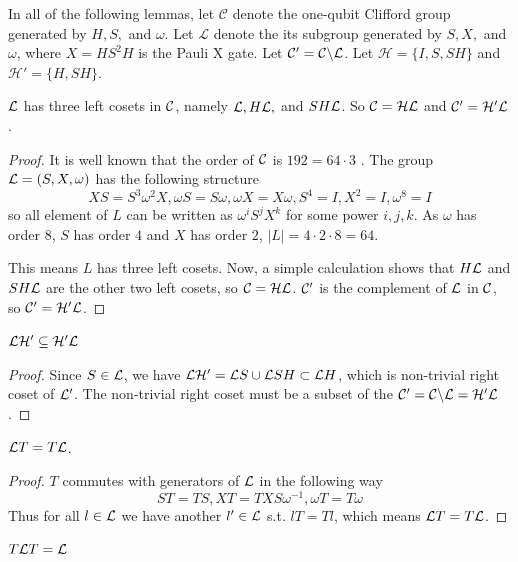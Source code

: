 In all of the following lemmas, let $\mathcal{C}$ denote the one-qubit Clifford group generated by $H, S,$ and $\omega$. 
Let $\mathcal{L}$ denote the its subgroup generated by $S, X, $ and $\omega$, where $X = HS^2H$ is the Pauli X gate. 
Let $\mathcal{C} ' =  \mathcal{C} \backslash \mathcal{L}$.
Let $\mathcal{H} = \{I, S, SH\}$ and $\mathcal{H}' = \{H, SH\}$.

\begin{lemma}
	$\mathcal{L}$ has three left cosets in $\mathcal{C}$, namely $\mathcal{L}, H\mathcal{L},$ and $SH\mathcal{L}$. 
	So $\mathcal{C} = \mathcal{H} \mathcal{L}$ and $\mathcal{C}' = \mathcal{H}' \mathcal{L}$.
\end{lemma}

\begin{proof}
	It is well known that the order of $\mathcal{C}$ is $192 = 64 \cdot 3$ \cite{mastel2025cliffordtheorynqubitclifford}. 
	The group $\mathcal{L} = (S, X, \omega)$ has the following structure
	$$
	XS = S^3 \omega^2 X, \omega S = S \omega, \omega X = X \omega, S^4 = I, X^2 = I, \omega^8 = I
	$$
	so all element of $L$ can be written as $\omega^i S^j X^k$ for some power $i, j, k$.
	As $\omega$ has order $8$, $S$ has order $4$ and $X$ has order $2$, $|L| = 4 \cdot 2 \cdot 8 = 64$.

	This means $L$ has three left cosets.
	Now, a simple calculation shows that $H\mathcal{L}$ and $SH\mathcal{L}$ are the other two left cosets, so $\mathcal{C} = \mathcal{H} \mathcal{L}$.
	$\mathcal{C}'$ is the complement of $\mathcal{L}$ in $\mathcal{C}$, so $\mathcal{C}' = \mathcal{H}' \mathcal{L}$.
\end{proof} 

\begin{lemma}
	$\mathcal{L} \mathcal{H} ' \subseteq \mathcal{H} ' \mathcal{L}$
\end{lemma}

\begin{proof}
	Since $S \in \mathcal{L}$, we have $\mathcal{L}\mathcal{H}' = \mathcal{L} S \cup \mathcal{L} SH \subset \mathcal{L} H$, which is non-trivial right coset of $\mathcal{L}'$.
	The non-trivial right coset must be a subset of the $\mathcal{C}' = \mathcal{C} \backslash \mathcal{L} = \mathcal{H}'\mathcal{L}$.
\end{proof}

\begin{lemma}
	$\mathcal{L} T = T \mathcal{L}$.
\end{lemma}

\begin{proof}
	$T$ commutes with generators of $\mathcal{L}$ in the following way
	$$
	ST = TS, XT = T XS \omega^{-1}, \omega T = T \omega 
	$$
	Thus for all $l \in \mathcal{L}$ we have another $l' \in \mathcal{L}$ s.t. $lT = Tl$, which means $\mathcal{L} T = T \mathcal{L}$.	
\end{proof}

\begin{lemma}\label{TLT=L}
	$T\mathcal{L} T = \mathcal{L}$
\end{lemma}

